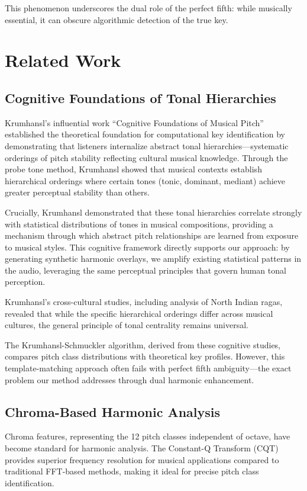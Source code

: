 \documentclass[10pt,twocolumn]{article}
\begin{document}
This phenomenon underscores the dual role of the perfect fifth: while musically essential, it can obscure algorithmic detection of the true key.


\section{Related Work}\label{sec:related-work}

\subsection{Cognitive Foundations of Tonal Hierarchies}\label{subsec:cognitive-foundations-of-tonal-hierarchies}
Krumhansl's influential work ``Cognitive Foundations of Musical Pitch'' \cite{krumhansl1990cognitive} established the theoretical foundation for computational key identification by demonstrating that listeners internalize abstract tonal hierarchies—systematic orderings of pitch stability reflecting cultural musical knowledge. Through the probe tone method, Krumhansl showed that musical contexts establish hierarchical orderings where certain tones (tonic, dominant, mediant) achieve greater perceptual stability than others.

Crucially, Krumhansl demonstrated that these tonal hierarchies correlate strongly with statistical distributions of tones in musical compositions, providing a mechanism through which abstract pitch relationships are learned from exposure to musical styles. This cognitive framework directly supports our approach: by generating synthetic harmonic overlays, we amplify existing statistical patterns in the audio, leveraging the same perceptual principles that govern human tonal perception.

Krumhansl's cross-cultural studies, including analysis of North Indian ragas, revealed that while the specific hierarchical orderings differ across musical cultures, the general principle of tonal centrality remains universal.

The Krumhansl-Schmuckler algorithm, derived from these cognitive studies, compares pitch class distributions with theoretical key profiles. However, this template-matching approach often fails with perfect fifth ambiguity—the exact problem our method addresses through dual harmonic enhancement.

\subsection{Chroma-Based Harmonic Analysis}\label{subsec:chroma-based-harmonic-analysis}
Chroma features, representing the 12 pitch classes independent of octave, have become standard for harmonic analysis\cite{muller2011chroma}.
The Constant-Q Transform (CQT) provides superior frequency resolution for musical applications compared to traditional FFT-based methods, making it ideal for precise pitch class identification.
\end{document}
